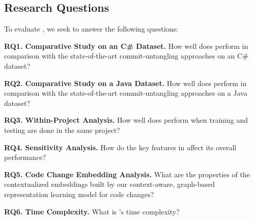 \subsection{Research Questions}

To evaluate {\tool}, we seek to answer the following questions:

\noindent\textbf{RQ1. Comparative Study on an C\# Dataset.}  How well
does {\tool} perform in comparison with the state-of-the-art
commit-untangling approaches on an C\# dataset?

\noindent\textbf{RQ2. Comparative Study on a Java Dataset.}  How well
does {\tool} perform in comparison with the state-of-the-art
commit-untangling approaches on a Java dataset?

\noindent\textbf{RQ3. Within-Project Analysis.}  How well does {\tool}
perform when training and testing are done in the same project?


\noindent\textbf{RQ4. Sensitivity Analysis.} How do the key features
in {\tool} affect its overall performance?

\noindent\textbf{RQ5. Code Change Embedding Analysis.} What are the
properties of the contextualized embeddings built by our
context-aware, graph-based representation learning model for code
changes?

\noindent\textbf{RQ6. Time Complexity.} What is {\tool}'s time
complexity?
